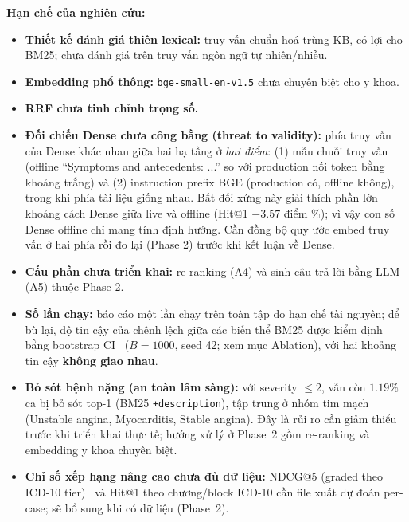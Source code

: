 \textbf{Hạn chế của nghiên cứu:}
\begin{itemize}
    \item \textbf{Thiết kế đánh giá thiên lexical:} truy vấn chuẩn hoá trùng KB, có lợi cho BM25; chưa đánh giá trên truy vấn ngôn ngữ tự nhiên/nhiễu.
    \item \textbf{Embedding phổ thông:} \texttt{bge-small-en-v1.5} chưa chuyên biệt cho y khoa.
    \item \textbf{RRF chưa tinh chỉnh trọng số.}
    \item \textbf{Đối chiếu Dense chưa công bằng (threat to validity):} phía truy vấn của Dense khác nhau giữa hai hạ tầng ở \emph{hai điểm}: (1) mẫu chuỗi truy vấn (offline ``Symptoms and antecedents: ...'' so với production nối token bằng khoảng trắng) và (2) instruction prefix BGE (production có, offline không), trong khi phía tài liệu giống nhau. Bất đối xứng này giải thích phần lớn khoảng cách Dense giữa live và offline (Hit@1 $-3.57$ điểm \%); vì vậy con số Dense offline chỉ mang tính định hướng. Cần đồng bộ quy ước embed truy vấn ở hai phía rồi đo lại (Phase 2) trước khi kết luận về Dense.
    \item \textbf{Cấu phần chưa triển khai:} re-ranking (A4) và sinh câu trả lời bằng LLM (A5) thuộc Phase 2.
    \item \textbf{Số lần chạy:} báo cáo một lần chạy trên toàn tập do hạn chế tài nguyên; để bù lại, độ tin cậy của chênh lệch giữa các biến thể BM25 được kiểm định bằng bootstrap CI~\cite{johnson2001bootstrap} ($B=1000$, seed 42; xem mục Ablation), với hai khoảng tin cậy \textbf{không giao nhau}.
    \item \textbf{Bỏ sót bệnh nặng (an toàn lâm sàng):} với severity $\le 2$, vẫn còn $1.19\%$ ca bị bỏ sót top-1 (BM25 \texttt{+description}), tập trung ở nhóm tim mạch (Unstable angina, Myocarditis, Stable angina). Đây là rủi ro cần giảm thiểu trước khi triển khai thực tế; hướng xử lý ở Phase~2 gồm re-ranking và embedding y khoa chuyên biệt.
    \item \textbf{Chỉ số xếp hạng nâng cao chưa đủ dữ liệu:} NDCG@5 (graded theo ICD-10 tier)~\cite{jarvelin2002ndcg} và Hit@1 theo chương/block ICD-10 cần file xuất dự đoán per-case; sẽ bổ sung khi có dữ liệu (Phase~2).
\end{itemize}
